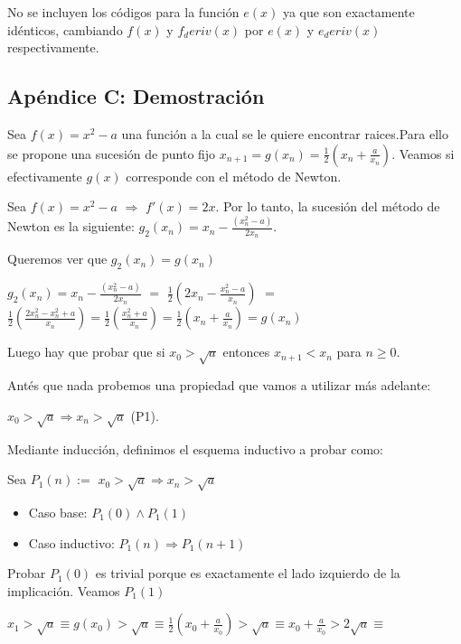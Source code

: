 No se incluyen los c\'odigos para la funci\'on $e(x)$ ya que son exactamente id\'enticos, cambiando $f(x)$ y $f_deriv(x)$ por $e(x)$ y $e_deriv(x)$ respectivamente.


\subsection{Apéndice C: Demostración}

Sea $f(x) = x^2 -a$ una funci\'on a la cual se le quiere encontrar raices.Para ello se propone una sucesi\'on de punto fijo $x_{n+1} = g(x_n) = \frac{1}{2}\left(x_n+ \frac{a}{x_n}\right)$. Veamos si efectivamente $g(x)$ corresponde con el m\'etodo de Newton.

Sea $f(x) = x^2 - a$ $\Rightarrow$ $f'(x) = 2x$. Por lo tanto, la sucesi\'on del m\'etodo de Newton es la siguiente: $g_{2}(x_n) = x_n - \frac{(x_{n}^2 -a)}{2x_n}$. 

Queremos ver que $g_2(x_n)=g(x_n)$ 

$\displaystyle g_{2}(x_n) = \displaystyle x_n - \frac{(x_{n}^2 -a)}{2x_n}$ $=$ $\displaystyle \frac{1}{2}\left(2x_n - \frac{x_{n}^2 - a}{x_n}\right)$ $=$ $\displaystyle \frac{1}{2}\left(\frac{2x_{n}^2 -x_{n}^2 + a}{x_n}\right) = \frac{1}{2}\left(\frac{x_{n}^2 + a}{x_n}\right) = \frac{1}{2}\left(x_{n} + \frac{a}{x_n}\right) = g(x_n)$

Luego hay que probar que si $x_0 > \sqrt{a}$ entonces $x_{n+1} < x_n$ para $n \geq 0$.

Ant\'es que nada probemos una propiedad que vamos a utilizar m\'as adelante:

\hspace{6.5cm}$x_0 > \sqrt{a} \Rightarrow x_n > \sqrt{a}$ (P1). 

Mediante inducci\'on, definimos el esquema inductivo a probar como:

Sea $P_1(n):=$ $x_0 > \sqrt{a} \Rightarrow x_n > \sqrt{a} $
\begin{itemize}
	\item Caso base: $P_1(0) \land P_1(1)$ 
	\item Caso inductivo: $P_1(n) \Rightarrow P_1(n+1)$
\end{itemize}

Probar $P_1(0)$ es trivial porque es exactamente el lado izquierdo de la implicaci\'on. Veamos $P_1(1)$

\hspace{4cm}$\displaystyle  x_1 > \sqrt{a} \equiv g(x_0) > \sqrt{a} \equiv \frac{1}{2}\left(x_0+ \frac{a}{x_0}\right) > \sqrt{a} \equiv x_0+ \frac{a}{x_0} > 2\sqrt{a}\equiv$


